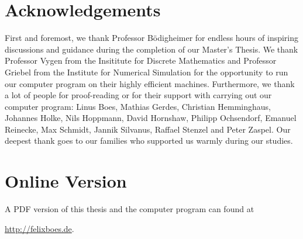 \section*{Acknowledgements}

First and foremost, we thank Professor Bödigheimer for endless hours of inspiring discussions and guidance during the completion of our Master's Thesis.
We thank Professor Vygen from the Insititute for Discrete Mathematics and Professor Griebel from the Institute for Numerical Simulation 
for the opportunity to run our computer program on their highly efficient machines.
Furthermore, we thank a lot of people for proof-reading or for their support with carrying out our computer program:
Linus Boes, Mathias Gerdes, Christian Hemminghaus, Johannes Holke, Nils Hoppmann, David Hornshaw, Philipp Ochsendorf, Emanuel Reinecke, Max Schmidt, Jannik Silvanus, Raffael Stenzel and Peter Zaspel.
Our deepest thank goes to our families who supported us warmly during our studies.

\section*{Online Version}
A PDF version of this thesis and the computer program can found at
\begin{center}
    \url{http://felixboes.de}.
\end{center}